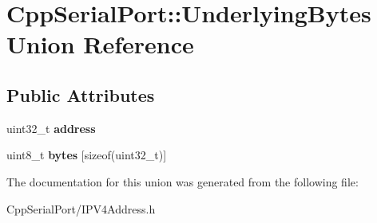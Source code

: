 \hypertarget{union_cpp_serial_port_1_1_underlying_bytes}{}\section{Cpp\+Serial\+Port\+:\+:Underlying\+Bytes Union Reference}
\label{union_cpp_serial_port_1_1_underlying_bytes}
\subsection*{Public Attributes}
\begin{DoxyCompactItemize}
\item 
\mbox{\label{union_cpp_serial_port_1_1_underlying_bytes_afc39c8526c0656fc0d04299782d0c431}} 
uint32\+\_\+t {\bfseries address}
\item 
\mbox{\label{union_cpp_serial_port_1_1_underlying_bytes_a32fff31872b18ddf0750ce09243c5a93}} 
uint8\+\_\+t {\bfseries bytes} \mbox{[}sizeof(uint32\+\_\+t)\mbox{]}
\end{DoxyCompactItemize}


The documentation for this union was generated from the following file\+:\begin{DoxyCompactItemize}
\item 
Cpp\+Serial\+Port/I\+P\+V4\+Address.\+h\end{DoxyCompactItemize}
